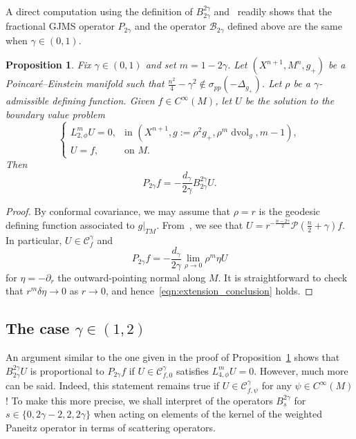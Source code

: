 \documentclass{amsart}
\newtheorem{prop}[thm]{Proposition}
\theoremstyle{definition}
\theoremstyle{remark}
\numberwithin{equation}{section}
\begin{document}
A direct computation using the definition of $B_{2\gamma}^{2\gamma}$ and~\cite[Theorem~4.1]{CaseChang2013} readily shows that the fractional GJMS operator $P_{2\gamma}$ and the operator ${\mathcal{B}}_{2\gamma}$ defined above are the same when $\gamma\in(0,1)$.

\begin{prop}
 \label{prop:extension}
 Fix $\gamma\in(0,1)$ and set $m=1-2\gamma$.  Let $(X^{n+1},M^n,g_+)$ be a Poincar\'e--Einstein manifold such that $\frac{n^2}{4}-\gamma^2\not\in\sigma_{pp}(-\Delta_{g_+})$.  Let $\rho$ be a $\gamma$-admissible defining function.  Given $f\in C^\infty(M)$, let $U$ be the solution to the boundary value problem
 \begin{equation}
  \label{eqn:bvp0}
  \begin{cases}
   L_{2,\phi}^mU = 0, & \text{in $\left(X^{n+1},g:=\rho^2g_+,\rho^m\operatorname{dvol}_g,m-1\right)$}, \\
   U = f, & \text{on $M$}.
  \end{cases}
 \end{equation}
 Then
 \begin{equation}
 \label{eqn:extension_conclusion}
 P_{2\gamma}f = -\frac{d_\gamma}{2\gamma} B_{2\gamma}^{2\gamma}U .
 \end{equation}
\end{prop}

\begin{proof}
 By conformal covariance, we may assume that $\rho=r$ is the geodesic defining function associated to $g{\rvert}_{TM}$.  From~\cite[Theorem~4.1]{CaseChang2013}, we see that $U=r^{-\frac{n-2\gamma}{2}}{\mathcal{P}}(\frac{n}{2}+\gamma)f$.  In particular, $U\in{\mathcal{C}}_f^\gamma$ and
 \[ P_{2\gamma}f = -\frac{d_\gamma}{2\gamma}\lim_{\rho\to0}\rho^m\eta U \]
 for $\eta=-\partial_r$ the outward-pointing normal along $M$.  It is straightforward to check that $r^m\delta\eta\to0$ as $r\to0$, and hence~\eqref{eqn:extension_conclusion} holds.
\end{proof}

\subsection{The case $\gamma\in(1,2)$}
\label{subsec:asymptotics/2}

An argument similar to the one given in the proof of Proposition~\ref{prop:extension} shows that $B_{2\gamma}^{2\gamma}U$ is proportional to $P_{2\gamma}f$ if $U\in{\mathcal{C}}_{f,0}^\gamma$ satisfies $L_{4,\phi}^mU=0$.  However, much more can be said.  Indeed, this statement remains true if $U\in{\mathcal{C}}_{f,\psi}^\gamma$ for any $\psi\in C^\infty(M)$!  To make this more precise, we shall interpret of the operators $B_{s}^{2\gamma}$ for $s\in\{0,2\gamma-2,2,2\gamma\}$ when acting on elements of the kernel of the weighted Paneitz operator in terms of scattering operators.
\end{document}
